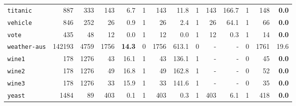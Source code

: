 \begin{tabular}{lccrrrrrrrrrrr}
\texttt{titanic} & \multicolumn{1}{r}{887} & \multicolumn{1}{r}{333}  & 143 & 6.7 & 1 & 143 & 11.8 & 1 & 143 & 166.7 & 1 & 148 & \textbf{0.0}\\
\texttt{vehicle} & \multicolumn{1}{r}{846} & \multicolumn{1}{r}{252}  & 26 & 0.9 & 1 & 26 & 2.4 & 1 & 26 & 64.1 & 1 & 66 & \textbf{0.0}\\
\texttt{vote} & \multicolumn{1}{r}{435} & \multicolumn{1}{r}{48}  & 12 & 0.0 & 1 & 12 & 0.0 & 1 & 12 & 0.3 & 1 & 14 & \textbf{0.0}\\
\texttt{weather-aus} & \multicolumn{1}{r}{142193} & \multicolumn{1}{r}{4759}  & 1756 & \textbf{14.3} & 0 & 1756 & 613.1 & 0 & - & - & 0 & 1761 & 19.6\\
\texttt{wine1} & \multicolumn{1}{r}{178} & \multicolumn{1}{r}{1276}  & 43 & 16.1 & 1 & 43 & 136.1 & 1 & - & - & 0 & 45 & \textbf{0.0}\\
\texttt{wine2} & \multicolumn{1}{r}{178} & \multicolumn{1}{r}{1276}  & 49 & 16.8 & 1 & 49 & 162.8 & 1 & - & - & 0 & 52 & \textbf{0.0}\\
\texttt{wine3} & \multicolumn{1}{r}{178} & \multicolumn{1}{r}{1276}  & 33 & 15.9 & 1 & 33 & 141.6 & 1 & - & - & 0 & 35 & \textbf{0.0}\\
\texttt{yeast} & \multicolumn{1}{r}{1484} & \multicolumn{1}{r}{89}  & 403 & 0.1 & 1 & 403 & 0.3 & 1 & 403 & 6.1 & 1 & 418 & \textbf{0.0}\\
\bottomrule
\end{tabular}
